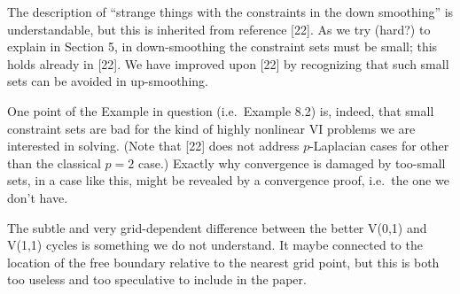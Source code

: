 \documentclass[letterpaper,final,12pt,reqno]{amsart}
\newenvironment{response}%
{\medskip\noindent}%
{}
\begin{document}
\begin{response}
The description of ``strange things with the constraints in the down smoothing'' is understandable, but this is inherited from reference [22].  As we try (hard?) to explain in Section 5, in down-smoothing the constraint sets must be small; this holds already in [22].  We have improved upon [22] by recognizing that such small sets can be avoided in up-smoothing.

One point of the Example in question (i.e.~Example 8.2) is, indeed, that small constraint sets are bad for the kind of highly nonlinear VI problems we are interested in solving.  (Note that [22] does not address $p$-Laplacian cases for other than the classical $p=2$ case.)  Exactly why convergence is damaged by too-small sets, in a case like this, might be revealed by a convergence proof, i.e.~the one we don't have.

The subtle and very grid-dependent difference between the better V(0,1) and V(1,1) cycles is something we do not understand.  It maybe connected to the location of the free boundary relative to the nearest grid point, but this is both too useless and too speculative to include in the paper.
\end{response}
\end{document}
